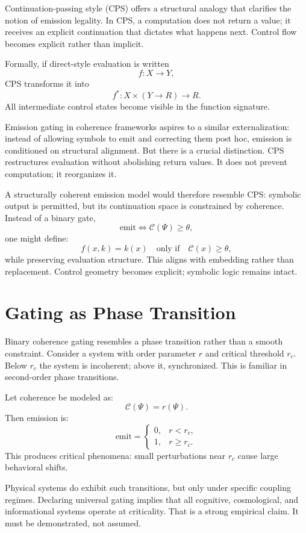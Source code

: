 \documentclass[12pt]{article}
\begin{document}
Continuation-passing style (CPS) offers a structural analogy that clarifies the notion of emission legality. In CPS, a computation does not return a value; it receives an explicit continuation that dictates what happens next. Control flow becomes explicit rather than implicit.

Formally, if direct-style evaluation is written
\[
  f : X \to Y,
\]
CPS transforms it into
\[
  f^\ast : X \times (Y \to R) \to R.
\]
All intermediate control states become visible in the function signature.

Emission gating in coherence frameworks aspires to a similar externalization: instead of allowing symbols to emit and correcting them post hoc, emission is conditioned on structural alignment. But there is a crucial distinction. CPS restructures evaluation without abolishing return values. It does not prevent computation; it reorganizes it.

A structurally coherent emission model would therefore resemble CPS: symbolic output is permitted, but its continuation space is constrained by coherence. Instead of a binary gate,
\[
  \text{emit} \iff \mathcal{C}(\Psi) \geq \theta,
\]
one might define:
\[
  f(x, k) = k(x) \quad \text{only if} \quad \mathcal{C}(x) \geq \theta,
\]
while preserving evaluation structure. This aligns with embedding rather than replacement. Control geometry becomes explicit; symbolic logic remains intact.

\section{Gating as Phase Transition}

Binary coherence gating resembles a phase transition rather than a smooth constraint. Consider a system with order parameter $r$ and critical threshold $r_c$. Below $r_c$ the system is incoherent; above it, synchronized. This is familiar in second-order phase transitions.

Let coherence be modeled as:
\[
  \mathcal{C}(\Psi) = r(\Psi).
\]
Then emission is:
\[
  \text{emit} =
  \begin{cases}
    0, & r < r_c, \\
    1, & r \ge r_c.
  \end{cases}
\]
This produces critical phenomena: small perturbations near $r_c$ cause large behavioral shifts.

Physical systems do exhibit such transitions, but only under specific coupling regimes. Declaring universal gating implies that all cognitive, cosmological, and informational systems operate at criticality. That is a strong empirical claim. It must be demonstrated, not assumed.
\end{document}
